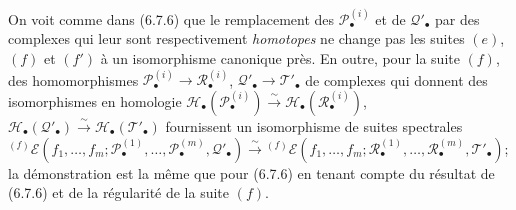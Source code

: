 \begin{remark}[6.9.5]
On voit comme dans (6.7.6) que le remplacement des
$\mathscr P_\bullet^{(i)}$ et de $\mathscr Q'_\bullet$ par des complexes qui
leur sont respectivement \emph{homotopes} ne change pas les suites $(e)$, $(f)$ et
$(f')$ à un isomorphisme canonique près. En outre, pour la suite $(f)$, des
homomorphismes
$\mathscr P_\bullet^{(i)}\to\mathscr R_\bullet^{(i)}$,
$\mathscr Q'_\bullet\to\mathscr T'_\bullet$ de complexes qui donnent des
isomorphismes en homologie
$\mathscr H_\bullet(\mathscr P_\bullet^{(i)})\xrightarrow{\sim}
\mathscr H_\bullet(\mathscr R_\bullet^{(i)})$,
$\mathscr H_\bullet(\mathscr Q'_\bullet)\xrightarrow{\sim}
\mathscr H_\bullet(\mathscr T'_\bullet)$ fournissent un isomorphisme de suites
spectrales
${}^{(f)}\mathscr E
(f_1,\ldots,f_m;
\mathscr P_\bullet^{(1)},\ldots,\mathscr P_\bullet^{(m)},
\mathscr Q'_\bullet)
\xrightarrow{\sim}
{}^{(f)}\mathscr E
(f_1,\ldots,f_m;
\mathscr R_\bullet^{(1)},\ldots,\mathscr R_\bullet^{(m)},
\mathscr T'_\bullet)$;
la démonstration est la même que pour (6.7.6) en tenant compte du résultat
de (6.7.6) et de la régularité de la suite $(f)$.
\end{remark}

